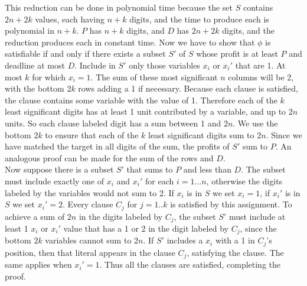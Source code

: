 \documentclass{article}
\begin{document}
This reduction can be done in polynomial time because the set $S$ contains $2n+2k$ values, each having $n+k$ digits, and the time to produce each is polynomial in $n+k$.  $P$ has $n+k$ digits, and $D$ has $2n+2k$ digits, and the reduction produces each in constant time. Now we have to show that $\phi$ is satisfiable if and only if there exists a subset $S'$ of $S$ whose profit is at least $P$ and deadline at most $D$. Include in $S'$ only those variables $x_i$ or $x_i'$ that are 1.  At most $k$ for which $x_i=1$. The sum of these most significant $n$ columns will be 2, with the bottom $2k$ rows adding a 1 if necessary. Because each clause is satisfied, the clause contains some variable with the value of 1. Therefore each of the $k$ least significant digits has at least 1 unit contributed by a variable, and up to $2n$ units. So each clause labeled digit has a sum between 1 and $2n$. We use the bottom $2k$ to ensure that each of the $k$ least significant digits sum to $2n$. Since we have matched the target in all digits of the sum, the profits of $S'$ sum to $P$.  An analogous proof can be made for the sum of the rows and $D$.\\
Now suppose there is a subset $S'$ that sums to $P$ and less than $D$. The subset must include exactly one of $x_i$ and $x_i'$ for each $i = 1...n$, otherwise the digits labeled by the variables would not sum to 2. If $x_i$ is in $S$ we set $x_i=1$, if $x_i'$ is in $S$ we set $x_i'=2$. Every clause $C_j$ for $j=1..k$ is satisfied by this assignment. To achieve a sum of $2n$ in the digits labeled by $C_j$, the subset $S'$ must include at least 1 $x_i$ or $x_i'$ value that has a 1 or 2 in the digit labeled by $C_j$, since the bottom $2k$ variables cannot sum to $2n$. If $S'$ includes a $x_i$ with a 1 in $C_j$'s position, then that literal appears in the clause $C_j$, satisfying the clause. The same applies when $x_i'=1$. Thus all the clauses are satisfied, completing the proof.
\end{document}
